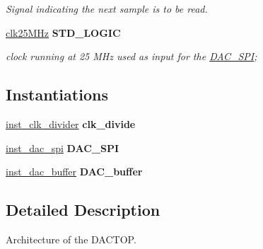 \begin{DoxyCompactItemize}
\begin{DoxyCompactList}\small\item\em Signal indicating the next sample is to be read. \end{DoxyCompactList}\item 
\hypertarget{classdac__Top_1_1TOP__DAC_a37a3bd4d2924357034d5991abe8dc60b}{\hyperlink{classdac__Top_1_1TOP__DAC_a37a3bd4d2924357034d5991abe8dc60b}{clk25\-M\-Hz} {\bfseries \textcolor{comment}{S\-T\-D\-\_\-\-L\-O\-G\-I\-C}\textcolor{vhdlchar}{ }} }\label{classdac__Top_1_1TOP__DAC_a37a3bd4d2924357034d5991abe8dc60b}

\begin{DoxyCompactList}\small\item\em clock running at 25 M\-Hz used as input for the \hyperlink{classDAC__SPI}{D\-A\-C\-\_\-\-S\-P\-I}; \end{DoxyCompactList}\end{DoxyCompactItemize}
\subsection*{Instantiations}
 \begin{DoxyCompactItemize}
\item 
\hypertarget{classdac__Top_1_1TOP__DAC_aea363b3d172cd6c1aee04b651b3107e7}{\hyperlink{classdac__Top_1_1TOP__DAC_aea363b3d172cd6c1aee04b651b3107e7}{inst\-\_\-clk\-\_\-divider}  {\bfseries clk\-\_\-divide}   }\label{classdac__Top_1_1TOP__DAC_aea363b3d172cd6c1aee04b651b3107e7}

\item 
\hypertarget{classdac__Top_1_1TOP__DAC_af2e139b1e2920fab9b0ee7d6e1710518}{\hyperlink{classdac__Top_1_1TOP__DAC_af2e139b1e2920fab9b0ee7d6e1710518}{inst\-\_\-dac\-\_\-spi}  {\bfseries D\-A\-C\-\_\-\-S\-P\-I}   }\label{classdac__Top_1_1TOP__DAC_af2e139b1e2920fab9b0ee7d6e1710518}

\item 
\hypertarget{classdac__Top_1_1TOP__DAC_a4c9b0988369af8d5e2c29b1762ae41a2}{\hyperlink{classdac__Top_1_1TOP__DAC_a4c9b0988369af8d5e2c29b1762ae41a2}{inst\-\_\-dac\-\_\-buffer}  {\bfseries D\-A\-C\-\_\-buffer}   }\label{classdac__Top_1_1TOP__DAC_a4c9b0988369af8d5e2c29b1762ae41a2}

\end{DoxyCompactItemize}


\subsection{Detailed Description}
Architecture of the D\-A\-C\-T\-O\-P. 


